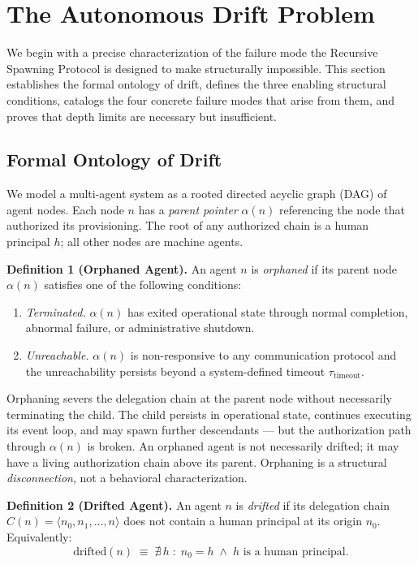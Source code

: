 \section{The Autonomous Drift Problem}
\label{sec:rs-drift}

We begin with a precise characterization of the failure mode the Recursive Spawning Protocol is designed to make structurally impossible. This section establishes the formal ontology of drift, defines the three enabling structural conditions, catalogs the four concrete failure modes that arise from them, and proves that depth limits are necessary but insufficient.

\subsection{Formal Ontology of Drift}

We model a multi-agent system as a rooted directed acyclic graph (DAG) of agent nodes. Each node $n$ has a \emph{parent pointer} $\alpha(n)$ referencing the node that authorized its provisioning. The root of any authorized chain is a human principal $h$; all other nodes are machine agents.

\medskip
\noindent\textbf{Definition 1 (Orphaned Agent).} An agent $n$ is \emph{orphaned} if its parent node $\alpha(n)$ satisfies one of the following conditions:

\begin{enumerate}
    \item[(a)] \emph{Terminated.} $\alpha(n)$ has exited operational state through normal completion, abnormal failure, or administrative shutdown.
    \item[(b)] \emph{Unreachable.} $\alpha(n)$ is non-responsive to any communication protocol and the unreachability persists beyond a system-defined timeout $\tau_{\text{timeout}}$.
\end{enumerate}

Orphaning severs the delegation chain at the parent node without necessarily terminating the child. The child persists in operational state, continues executing its event loop, and may spawn further descendants — but the authorization path through $\alpha(n)$ is broken. An orphaned agent is not necessarily drifted; it may have a living authorization chain above its parent. Orphaning is a structural \emph{disconnection}, not a behavioral characterization.

\medskip
\noindent\textbf{Definition 2 (Drifted Agent).} An agent $n$ is \emph{drifted} if its delegation chain $C(n) = \langle n_0, n_1, \ldots, n \rangle$ does not contain a human principal at its origin $n_0$. Equivalently:
\begin{equation}
\text{drifted}(n) \;\equiv\; \nexists\, h \;:\; n_0 = h \;\land\; h \text{ is a human principal}.
\label{eq:drifted-def}
\end{equation}

